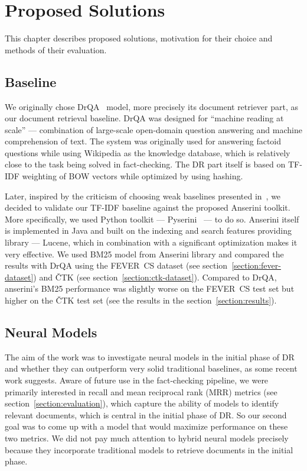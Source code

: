 \chapter{Proposed Solutions}
\label{chapter:prop-sol}
    This chapter describes proposed solutions, motivation for their choice and methods of their evaluation.

\section{Baseline}
\label{section:prop-baseline}
    We originally chose DrQA~\parencite{chen2017reading-drqa} model, more precisely its document retriever part, as our document retrieval baseline. DrQA was designed for \enquote{machine reading at scale} --- combination of large-scale open-domain question answering and machine comprehension of text. The system was originally used for answering factoid questions while using Wikipedia as the knowledge database, which is relatively close to the task being solved in fact-checking. The DR part itself is based on TF-IDF weighting of BOW vectors while optimized by using hashing.
    
    Later, inspired by the criticism of choosing weak baselines presented in~\parencite{Yang_2019}, we decided to validate our TF-IDF baseline against the proposed Anserini toolkit. More specifically, we used Python toolkit --- Pyserini~\parencite{lin2021pyserini} --- to do so. Anserini itself is implemented in Java and built on the indexing and search features providing library --- Lucene, which in combination with a significant optimization makes it very effective. We used BM25 model from Anserini library and compared the results with DrQA using the FEVER~CS dataset (see section~\ref{section:fever-dataset}) and ČTK (see section~\ref{section:ctk-dataset}). Compared to DrQA, anserini's BM25 performance was slightly worse on the FEVER~CS test set but higher on the ČTK test set (see the results in the section~\ref{section:results}).


\section{Neural Models}
\label{section:prop-neural}
    The aim of the work was to investigate neural models in the initial phase of DR and whether they can outperform very solid traditional baselines, as some recent work suggests. Aware of future use in the fact-checking pipeline, we were primarily interested in recall and mean reciprocal rank (MRR) metrics (see section~\ref{section:evaluation}), which capture the ability of models to identify relevant documents, which is central in the initial phase of DR. So our second goal was to come up with a model that would maximize performance on these two metrics. We did not pay much attention to hybrid neural models precisely because they incorporate traditional models to retrieve documents in the initial phase.

